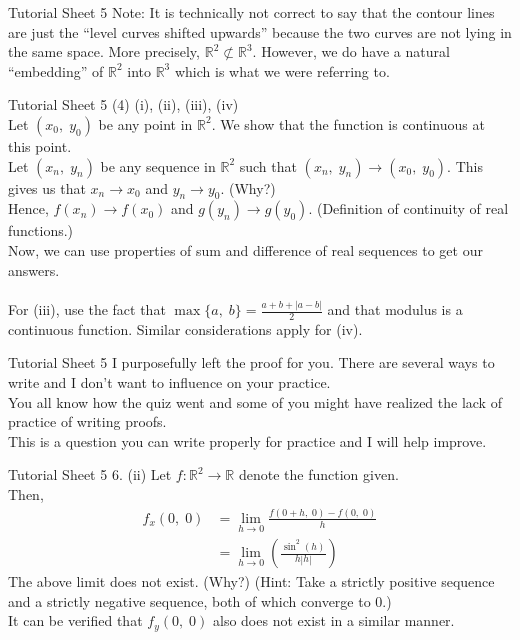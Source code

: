 \documentclass[aspectratio=169]{beamer}
\begin{document}
\begin{frame}{Tutorial Sheet 5}
	Note: It is technically not correct to say that the contour lines are just the ``level curves shifted upwards'' because the two curves are not lying in the same space. More precisely, $\mathbb{R}^2 \not\subset \mathbb{R}^3.$ However, we do have a natural ``embedding'' of $\mathbb{R}^2$ into $\mathbb{R}^3$ which is what we were referring to.
\end{frame}

\begin{frame}{Tutorial Sheet 5}
	(4) (i), (ii), (iii), (iv) \\
	Let $(x_0,\;y_0)$ be any point in $\mathbb{R}^2.$ We show that the function is continuous at this point. \\
	Let $(x_n,\;y_n)$ be any sequence in $\mathbb{R}^2$ such that $(x_n,\;y_n) \to (x_0,\;y_0).$ This gives us that $x_n \to x_0$ and $y_n \to y_0.$ \hfill (Why?) \\
	Hence, $f(x_n) \to f(x_0)$ and $g(y_n) \to g(y_0).$ (Definition of continuity of real functions.) \\
	Now, we can use properties of sum and difference of real sequences to get our answers. \\~\\
	For (iii), use the fact that $\max\{a,\;b\} = \frac{a + b + |a - b|}{2}$ and that modulus is a continuous function. Similar considerations apply for (iv).
\end{frame}

\begin{frame}{Tutorial Sheet 5}
	I purposefully left the proof for you. There are several ways to write and I don't want to influence on your practice. \\
	You all know how the quiz went and some of you might have realized the lack of practice of writing proofs. \\
	This is a question you can write properly for practice and I will help improve. \\
\end{frame}

\begin{frame}{Tutorial Sheet 5}
	6. (ii) Let $f:\mathbb{R}^2 \to \mathbb{R}$ denote the function given. \\
	Then, 
	\begin{align*}
		f_x(0,\;0) &= \displaystyle\lim_{h\to 0}\frac{f(0+h,\;0) - f(0,\;0)}{h} \\
		&= \displaystyle\lim_{h\to 0}\left(\frac{\sin^2(h)}{h|h|}\right)
	\end{align*}
	The above limit does not exist. \hfill (Why?)
	(Hint: Take a strictly positive sequence and a strictly negative sequence, both of which converge to 0.) \\
	It can be verified that $f_y(0,\;0)$ also does not exist in a similar manner.
\end{frame}
\end{document}
